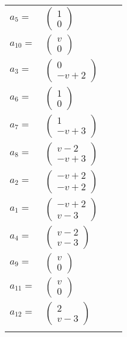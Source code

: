 \documentclass[1p]{elsarticle_modified}
\theoremstyle{definition}
\begin{document}
\begin{tabular}{m{7pt} m{180pt} m{7pt} m{180pt} }
\flushright $a_{5}=$&$\begin{pmatrix}1\\0\end{pmatrix}$ \\
\flushright $a_{10}=$&$\begin{pmatrix}v\\0\end{pmatrix}$ \\
\flushright $a_{3}=$&$\begin{pmatrix}0\\- v+2\end{pmatrix}$ \\
\flushright $a_{6}=$&$\begin{pmatrix}1\\0\end{pmatrix}$ \\
\flushright $a_{7}=$&$\begin{pmatrix}1\\- v+3\end{pmatrix}$ \\
\flushright $a_{8}=$&$\begin{pmatrix}v-2\\- v+3\end{pmatrix}$ \\
\flushright $a_{2}=$&$\begin{pmatrix}- v+2\\- v+2\end{pmatrix}$ \\
\flushright $a_{1}=$&$\begin{pmatrix}- v+2\\v-3\end{pmatrix}$ \\
\flushright $a_{4}=$&$\begin{pmatrix}v-2\\v-3\end{pmatrix}$ \\
\flushright $a_{9}=$&$\begin{pmatrix}v\\0\end{pmatrix}$ \\
\flushright $a_{11}=$&$\begin{pmatrix}v\\0\end{pmatrix}$ \\
\flushright $a_{12}=$&$\begin{pmatrix}2\\v-3\end{pmatrix}$\\&\end{tabular}
\end{document}
